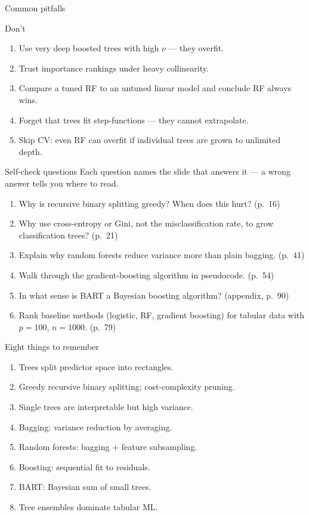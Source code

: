 \documentclass[aspectratio=169,11pt]{beamer}
\begin{document}
\begin{frame}{Common pitfalls}
  \begin{alertblock}{Don't}
    \begin{enumerate}
      \item Use very deep boosted trees with high $\nu$ --- they
            overfit.
      \item Trust importance rankings under heavy collinearity.
      \item Compare a tuned RF to an untuned linear model and conclude
            RF always wins.
      \item Forget that trees fit step-functions --- they cannot
            extrapolate.
      \item Skip CV: even RF can overfit if individual trees are grown to unlimited depth.
    \end{enumerate}
  \end{alertblock}
\end{frame}

\begin{frame}{Self-check questions}
  Each question names the slide that answers it --- a wrong answer tells you
  where to read.
  \begin{enumerate}
    \item Why is recursive binary splitting greedy? When does this
          hurt? (p.~16)
    \item Why use cross-entropy or Gini, not the misclassification
          rate, to grow classification trees? (p.~21)
    \item Explain why random forests reduce variance more than plain
          bagging. (p.~41)
    \item Walk through the gradient-boosting algorithm in pseudocode.
          (p.~54)
    \item In what sense is BART a Bayesian boosting algorithm?
          (appendix, p.~90)
    \item Rank baseline methods (logistic, RF, gradient boosting) for
          tabular data with $p = 100$, $n = 1000$. (p.~79)
  \end{enumerate}
\end{frame}

\begin{frame}{Eight things to remember}
  \begin{enumerate}
    \item Trees split predictor space into rectangles.
    \item Greedy recursive binary splitting; cost-complexity pruning.
    \item Single trees are interpretable but high variance.
    \item Bagging: variance reduction by averaging.
    \item Random forests: bagging + feature subsampling.
    \item Boosting: sequential fit to residuals.
    \item BART: Bayesian sum of small trees.
    \item Tree ensembles dominate tabular ML.
  \end{enumerate}
\end{frame}
\end{document}
